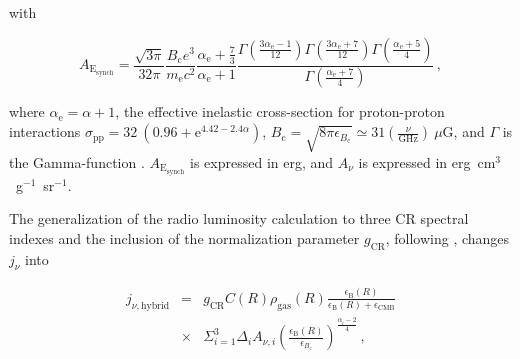 \documentclass[traditabstract]{aa}
\newcommand{\rmn}{\mathrm}
\begin{document}
\begin{appendix}
with

\begin{equation}
A_{\rmn{E_{synch}}} = \frac{\sqrt{3\pi}}{32\pi}\frac{B_{\rmn{c}}e^{3}}{m_{\rmn{e}}c^{2}}\frac{\alpha_{\rmn{e}}+\frac{7}{3}}{\alpha_{\rmn{e}}+1}\frac{\Gamma\left(\frac{3\alpha_{\rmn{e}}-1}{12}\right)\Gamma\left(\frac{3\alpha_{\rmn{e}}+7}{12}\right)\Gamma\left(\frac{\alpha_{\rmn{e}}+5}{4}\right)}{\Gamma\left(\frac{\alpha_{\rmn{e}}+7}{4}\right)} \, ,
\end{equation}

where $\alpha_{\rmn{e}}=\alpha+1$, the effective inelastic cross-section for proton-proton interactions $\sigma_{\rmn{pp}} = 32~(0.96+\rmn{e}^{4.42-2.4\alpha})$, $B_{\rmn{c}} = \sqrt{ 8 \pi \epsilon_{B_{\rmn{c}}}} \simeq 31 \left( \frac{\nu}{\rmn{GHz}} \right)~\mu$G, and $\Gamma$ is the Gamma-function \citep{1965hmfw.book.....A}. $A_{\rmn{E_{synch}}}$ is expressed in erg, and $A_{\nu}$ is expressed in erg~cm$^{3}$~g$^{-1}$~sr$^{-1}$. 



The generalization of the radio luminosity calculation to three CR spectral indexes and the inclusion of the normalization parameter $g_{\rmn{CR}}$, following \cite{2010MNRAS.409..449P}, changes $j_{\nu}$ into

\begin{eqnarray}
j_{\nu,\rmn{hybrid}} & = &g_{\rmn{CR}} C(R) \rho_{\rmn{gas}}(R) \frac{\epsilon_{\rmn{B}}(R)}{\epsilon_{\rmn{B}}(R)+\epsilon_{\rmn{CMB}}} \nonumber \\
& \times & \Sigma_{i=1}^{3} \Delta_{i} A_{\nu,i} \left( \frac{\epsilon_{\rmn{B}}(R)}{\epsilon_{B_{\rmn{c}}}} \right)^{\frac{\alpha_{i}-2}{4}}  \, ,
\end{eqnarray}


\end{appendix}
\end{document}
